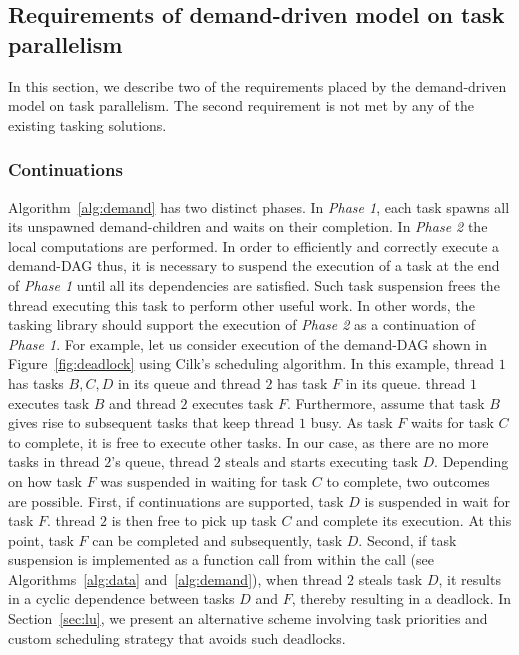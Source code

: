 \documentclass[10pt,conference]{IEEEtran}
\begin{document}
\subsection{Requirements of demand-driven model on task parallelism}
\label{sec:requirements}
In this section, we describe two of the requirements placed by the
demand-driven model on task parallelism. The second requirement is not met by
any of the existing tasking solutions.

\subsubsection{Continuations}
\label{sec:cont}
Algorithm~\ref{alg:demand} has two distinct phases. In \textit{Phase 1}, each
task spawns all its unspawned demand-children and waits on their completion. In
\textit{Phase 2} the local computations are performed. In order to efficiently
and correctly execute a demand-DAG thus, it is necessary to suspend the
execution of a task at the end of \textit{Phase 1} until all its dependencies
are satisfied. Such task suspension frees the thread executing this task to
perform other useful work. In other words, the tasking library should support
the execution of \textit{Phase 2} as a continuation of \textit{Phase 1}.  For
example, let us consider execution of the demand-DAG shown in
Figure~\ref{fig:deadlock} using Cilk's scheduling algorithm. In this example,
thread $1$ has tasks $B,C,D$ in its queue and thread $2$ has task $F$ in its
queue. thread $1$ executes task $B$ and thread $2$ executes task $F$.
Furthermore, assume that task $B$ gives rise to subsequent tasks that keep
thread $1$ busy.  As task $F$ waits for task $C$ to complete, it is free to
execute other tasks. In our case, as there are no more tasks in thread $2$'s
queue, thread $2$ steals and starts executing task $D$.  Depending on how task
$F$ was suspended in waiting for task $C$ to complete, two outcomes are
possible. First, if continuations are supported, task $D$ is suspended in wait
for task $F$. thread $2$ is then free to pick up task $C$ and complete its
execution. At this point, task $F$ can be completed and subsequently, task
$D$.  Second, if task suspension is implemented as a function call from
within the  call (see Algorithms~\ref{alg:data}
and~\ref{alg:demand}), when thread $2$ steals task $D$, it results in a
cyclic dependence between tasks $D$ and $F$, thereby resulting in a deadlock.
In Section~\ref{sec:lu}, we present an alternative scheme involving task
priorities and custom scheduling strategy that avoids such deadlocks.
\end{document}
